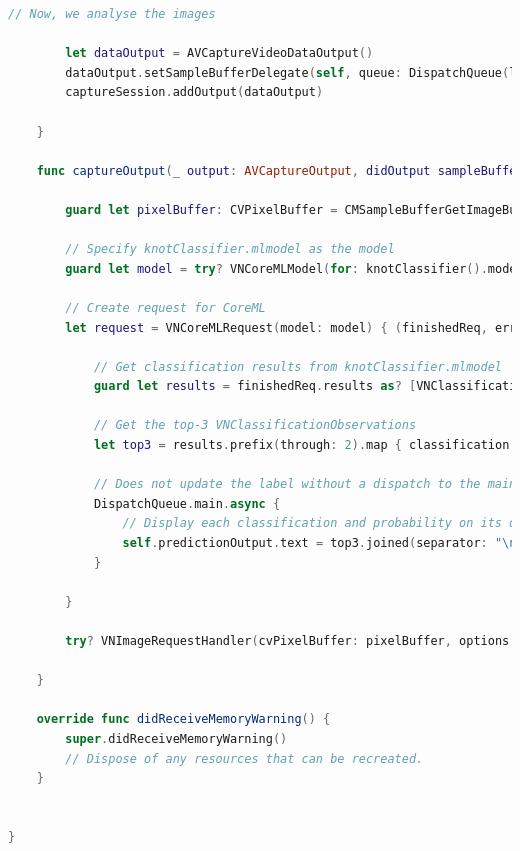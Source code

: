 \documentclass{l4proj}
\begin{document}
\begin{appendices}
\begin{lstlisting}[language=swift]
        // Now, we analyse the images
        
        let dataOutput = AVCaptureVideoDataOutput()
        dataOutput.setSampleBufferDelegate(self, queue: DispatchQueue(label: "videoQueue"))
        captureSession.addOutput(dataOutput)
        
    }
    
    func captureOutput(_ output: AVCaptureOutput, didOutput sampleBuffer: CMSampleBuffer, from connection: AVCaptureConnection) {
        
        guard let pixelBuffer: CVPixelBuffer = CMSampleBufferGetImageBuffer(sampleBuffer) else { return }
        
        // Specify knotClassifier.mlmodel as the model
        guard let model = try? VNCoreMLModel(for: knotClassifier().model) else { return }
        
        // Create request for CoreML
        let request = VNCoreMLRequest(model: model) { (finishedReq, err) in
            
            // Get classification results from knotClassifier.mlmodel
            guard let results = finishedReq.results as? [VNClassificationObservation] else { return }
            
            // Get the top-3 VNClassificationObservations
            let top3 = results.prefix(through: 2).map { classification in return String(format: " %@ (%.2f)", classification.identifier, classification.confidence) }
            
            // Does not update the label without a dispatch to the main thread.
            DispatchQueue.main.async {
                // Display each classification and probability on its own line, in order of probability
                self.predictionOutput.text = top3.joined(separator: "\n")
            }
            
        }
        
        try? VNImageRequestHandler(cvPixelBuffer: pixelBuffer, options: [:]).perform([request])
        
    }

    override func didReceiveMemoryWarning() {
        super.didReceiveMemoryWarning()
        // Dispose of any resources that can be recreated.
    }


}
\end{lstlisting}


\end{appendices}




\end{document}
